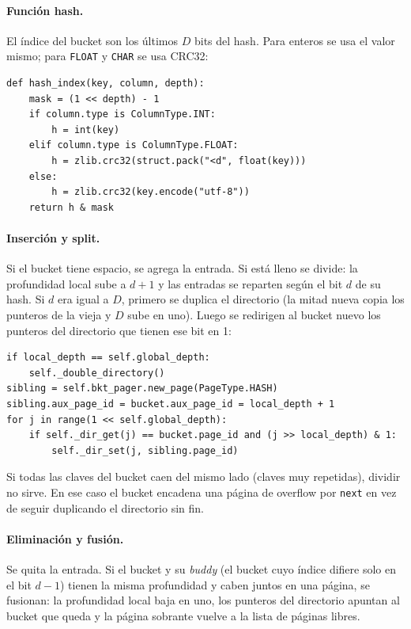 \documentclass[11pt,a4paper]{article}
\newcommand{\code}[1]{\texttt{#1}}
\begin{document}
\paragraph{Función hash.} El índice del bucket son los últimos $D$ bits del hash. Para
enteros se usa el valor mismo; para \code{FLOAT} y \code{CHAR} se usa CRC32:

\begin{lstlisting}
def hash_index(key, column, depth):
    mask = (1 << depth) - 1
    if column.type is ColumnType.INT:
        h = int(key)
    elif column.type is ColumnType.FLOAT:
        h = zlib.crc32(struct.pack("<d", float(key)))
    else:
        h = zlib.crc32(key.encode("utf-8"))
    return h & mask
\end{lstlisting}

\paragraph{Inserción y split.} Si el bucket tiene espacio, se agrega la entrada. Si
está lleno se divide: la profundidad local sube a $d+1$ y las entradas se reparten
según el bit $d$ de su hash. Si $d$ era igual a $D$, primero se duplica el directorio
(la mitad nueva copia los punteros de la vieja y $D$ sube en uno). Luego se
redirigen al bucket nuevo los punteros del directorio que tienen ese bit en 1:

\begin{lstlisting}
if local_depth == self.global_depth:
    self._double_directory()
sibling = self.bkt_pager.new_page(PageType.HASH)
sibling.aux_page_id = bucket.aux_page_id = local_depth + 1
for j in range(1 << self.global_depth):
    if self._dir_get(j) == bucket.page_id and (j >> local_depth) & 1:
        self._dir_set(j, sibling.page_id)
\end{lstlisting}

Si todas las claves del bucket caen del mismo lado (claves muy repetidas), dividir no
sirve. En ese caso el bucket encadena una página de overflow por \code{next} en vez de
seguir duplicando el directorio sin fin.

\paragraph{Eliminación y fusión.} Se quita la entrada. Si el bucket y su
\emph{buddy} (el bucket cuyo índice difiere solo en el bit $d-1$) tienen la misma
profundidad y caben juntos en una página, se fusionan: la profundidad local baja en
uno, los punteros del directorio apuntan al bucket que queda y la página sobrante
vuelve a la lista de páginas libres.
\end{document}
